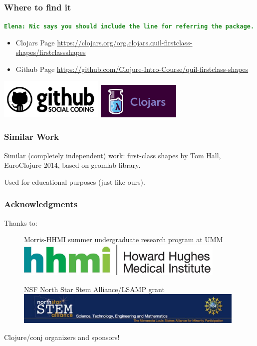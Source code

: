 \documentclass{beamer}
\newcommand{\comment}[1]{{\bf \tt  {#1}}}
\newcommand{\emcomment}[1]{\textcolor{ForestGreen}{\comment{Elena: {#1}}}}
\begin{document}
\begin{frame}
	\frametitle{Where to find it}
	\emcomment{Nic says you should include the line for referring the package.}
	\begin{itemize}
	\item Clojars Page
	\href{https://clojars.org/org.clojars.quil-firstclass-shapes/firstclassshapes}{https://clojars.org/org.clojars.quil-firstclass-shapes/firstclassshapes}
	\item Github Page
	\href{https://github.com/Clojure-Intro-Course/quil-firstclass-shapes}{https://github.com/Clojure-Intro-Course/quil-firstclass-shapes}
	\end{itemize}
	\includegraphics[width=5cm]{PresentationImages/github.png}
	\hspace{1cm}
	\includegraphics[width=4cm]{PresentationImages/clojars.png}
\end{frame}

\begin{frame}
	\frametitle{Similar Work}
Similar (completely independent) work: first-class shapes by Tom Hall, EuroClojure 2014, based on geomlab library. 

Used for educational purposes (just like ours).
\end{frame} 

\begin{frame}
\frametitle{Acknowledgments}
	{\large Thanks to:}
	\begin{figure}
		Morris-HHMI summer undergraduate research program at UMM \includegraphics[width=10cm]{PresentationImages/logoHHMI.jpg}
	\end{figure}
	\begin{figure}
		NSF North Star Stem Alliance/LSAMP grant 
		\includegraphics[width=11cm]{PresentationImages/logoStem.jpg}
	\end{figure}	
	{\centering \qquad Clojure/conj organizers and sponsors!}
\end{frame}
\end{document}

